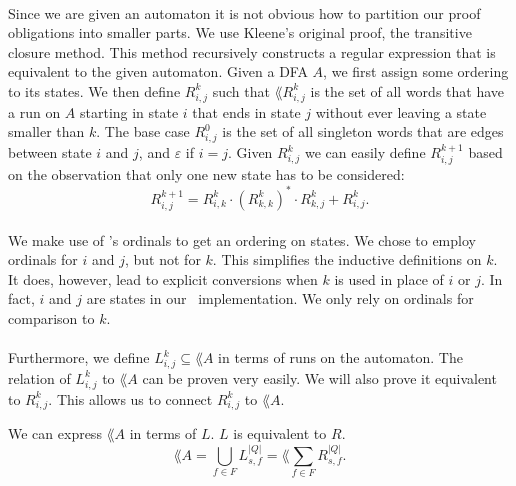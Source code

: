 \paragraph{}
Since we are given an automaton it is not obvious how to partition our proof obligations into smaller parts.
We use Kleene's original proof, the transitive closure method. 
This method recursively constructs a regular expression that is equivalent to the given automaton.
Given a DFA $A$, we first assign some ordering to its states. We then define $R^k_{i,j}$ such that 
$\lang{R^k_{i,j}}$ is the set of all words that have a run on $A$ starting in state $i$ that ends in state $j$ without ever leaving a state smaller than $k$. 
The base case $R^{0}_{i,j}$ is the set of all singleton words that are edges between state $i$ and $j$, and $\varepsilon$ if $i=j$. 
Given $R^k_{i,j}$ we can easily define $R^{k+1}_{i,j}$ based on the observation that only one new state has to be considered:
\begin{equation*}                    
    R^{k+1}_{i,j} = R^{k}_{i,k} \cdot (R^{k}_{k,k})^* \cdot R^{k}_{k,j} + R^{k}_{i,j}.                    
\end{equation*}
\paragraph{}
We make use of \ssreflect's ordinals to get an ordering on states. 
We chose to employ ordinals for $i$ and $j$, but not for $k$. 
This simplifies the inductive definitions on $k$. 
It does, however, lead to explicit conversions when $k$ is used in place of $i$ or $j$.
In fact, $i$ and $j$ are states in our \coq\ implementation. 
We only rely on ordinals for comparison to $k$.
\paragraph{}
Furthermore, we define $L^k_{i,j} \subseteq \lang{A}$ in terms of runs on the automaton. 
The relation of $L^k_{i,j}$ to $\lang{A}$ can be proven very easily.
We will also prove it equivalent to $R^k_{i,j}$.
This allows us to connect $R^k_{i,j}$ to $\lang{A}$.
\vspace{-0.3cm} 

\begin{theorem} We can express $\lang{A}$ in terms of $L$. $L$ is equivalent to $R$.
    \label{LR}
    \begin{equation*}                          
        \lang{A} = \bigcup\limits_{f \in F} L^{|Q|}_{s, f} = \lang{\sum\limits_{f \in F} R^{|Q|}_{s, f}}.                            
    \end{equation*}
\end{theorem}

